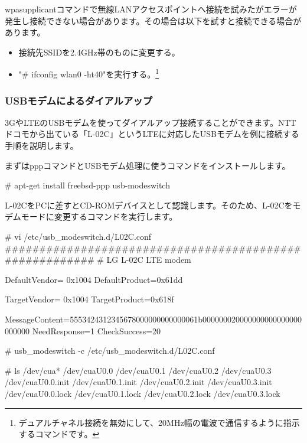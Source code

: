 \documentclass[mingoth,a4paper]{jsarticle}
\begin{document}
wpasupplicantコマンドで無線LANアクセスポイントへ接続を試みたがエラーが発生し接続できない場合があります。その場合は以下を試すと接続できる場合があります。

\begin{itemize}
  \item 接続先SSIDを2.4GHz帯のものに変更する。
  \item "\# ifconfig wlan0 -ht40"を実行する。\footnote{デュアルチャネル接続を無効にして、20MHz幅の電波で通信するように指示するコマンドです。}
\end{itemize}


\subsubsection{USBモデムによるダイアルアップ}

3GやLTEのUSBモデムを使ってダイアルアップ接続することができます。NTTドコモから出ている「L-02C」というLTEに対応したUSBモデムを例に接続する手順を説明します。

まずはpppコマンドとUSBモデム処理に使うコマンドをインストールします。

\begin{commandline}
  # apt-get install freebsd-ppp usb-modeswitch 
\end{commandline}

L-02CをPCに差すとCD-ROMデバイスとして認識します。そのため、L-02Cをモデムモードに変更するコマンドを実行します。

\begin{commandline}
  # vi /etc/usb_modeswitch.d/L02C.conf
  ########################################################
  # LG L-02C LTE modem

  DefaultVendor= 0x1004
  DefaultProduct=0x61dd

  TargetVendor= 0x1004
  TargetProduct=0x618f

  MessageContent=5553424312345678000000000000061b000000020000000000000000000000
  NeedResponse=1
  CheckSuccess=20

  # usb_modeswitch -c /etc/usb_modeswitch.d/L02C.conf
\end{commandline}

\begin{commandline}
  # ls /dev/cua*
  /dev/cuaU0.0       /dev/cuaU0.1       /dev/cuaU0.2       /dev/cuaU0.3
  /dev/cuaU0.0.init  /dev/cuaU0.1.init  /dev/cuaU0.2.init  /dev/cuaU0.3.init
  /dev/cuaU0.0.lock  /dev/cuaU0.1.lock  /dev/cuaU0.2.lock  /dev/cuaU0.3.lock
\end{commandline}
\end{document}

